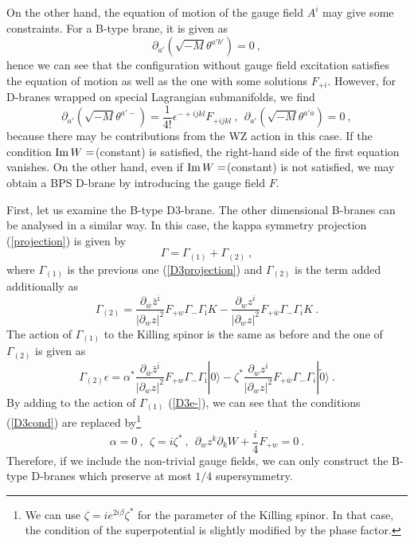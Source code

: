 \documentclass[a4paper,12pt]{article}
\numberwithin{equation}{section}
\newcommand{\ib}{\bar{\imath}}
\newcommand{\wb}{\bar{w}}
\newcommand{\zb}{\bar{z}}
\newcommand{\vac}{|0\rangle}
\newcommand{\vact}{|\tilde 0\rangle}
\DeclareMathOperator*{\im}{{\rm Im}}
\begin{document}
On the other hand, the equation of motion of the gauge field $A^i$
may give some constraints. 
For a B-type brane, it is given as
\begin{equation}
 \partial_{a'} (\sqrt{-M} \theta^{a'b'}) = 0 ~,
\end{equation}
hence we can see that the configuration without gauge field excitation
 satisfies
the equation of motion as well as the one with some solutions $F_{+i}$. 
However, for D-branes wrapped on special Lagrangian submanifolds, we find
\begin{equation}
 \partial_{a'} (\sqrt{-M} \theta^{a'-}) = 
 \frac{1}{4!} \epsilon^{-+ijkl} F_{+ijkl} ~,
 ~~ \partial_{a'} (\sqrt{-M} \theta^{a'a}) = 0 ~, 
\end{equation}
because there may be contributions from the WZ action in this case.
If the condition $\im W=$(constant) is satisfied, the right-hand side of the
first equation vanishes. On the other hand, even if $\im W=$(constant) is not
satisfied, we may obtain a BPS D-brane by introducing the gauge field $F$.

First, let us examine the B-type D3-brane. The other dimensional B-branes
can be analysed in a similar way.
In this case, the kappa symmetry projection (\ref{projection}) is
given by 
\begin{equation}
\Gamma = \Gamma_{(1)} + \Gamma_{(2)} ~,
\end{equation}
where $\Gamma_{(1)}$ is the previous one (\ref{D3projection})
and $\Gamma_{(2)}$ is the term added additionally as
\begin{equation}
 \Gamma_{(2)} =  \frac{\partial_{\wb} \zb^{\ib}}
               {|\partial _w z|^2} F_{+ w} \Gamma_- \Gamma_{\ib}K
        - \frac{\partial_w z^i}
               {|\partial _w z|^2} F_{+\wb} \Gamma_- \Gamma_i K ~. 
\end{equation}
The action of $\Gamma_{(1)}$ to the Killing spinor is the same as before
and the one of $\Gamma_{(2)}$ is given as
\begin{equation}
 \Gamma_{(2)} \epsilon  = 
  \alpha^* \frac{\partial_{\wb} \zb^{\ib}}
               {|\partial _w z|^2} F_{+ w} \Gamma_- \Gamma_{\ib} \vac
 - \zeta^* \frac{\partial_w z^i}
               {|\partial _w z|^2} F_{+\wb} \Gamma_- \Gamma_i \vact ~.
\end{equation}
By adding to the action of $\Gamma_{(1)}$ (\ref{D3e-}),   
we can see that the conditions (\ref{D3cond}) are replaced by\footnote{
We can use $\zeta = ie^{2i\beta}\zeta ^*$ for the parameter of the
Killing spinor. In that case, the condition of the superpotential is
slightly modified by the phase factor.
}
\begin{equation}
 \alpha = 0 ~, ~~\zeta =  i \zeta^* ~,~~
 \partial_w z^k \partial_k W +  \frac{i}{4} F_{+w} =0 ~. 
\label{modD3}
\end{equation}
Therefore, if we include the non-trivial gauge fields, we can only 
construct the B-type D-branes which preserve at most $1/4$ supersymmetry.
\end{document}

